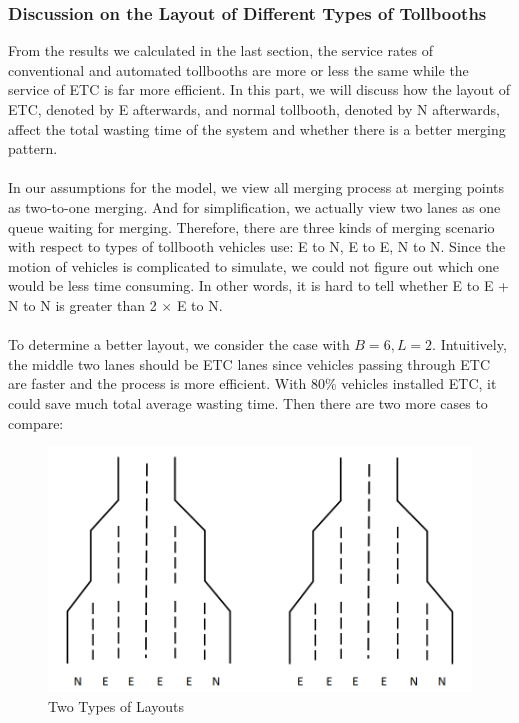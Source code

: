 \subsubsection{Discussion on the Layout of Different Types of Tollbooths}
From the results we calculated in the last section, the service rates of conventional and automated tollbooths are more or less the same while the service of ETC is far more efficient. In this part, we will discuss how the layout of ETC, denoted by E afterwards, and normal tollbooth, denoted by N afterwards, affect the total wasting time of the system and whether there is a better merging pattern.\\  
\\
In our assumptions for the model, we view all merging process at merging points as two-to-one merging. And for simplification, we actually view two lanes as one queue waiting for merging. Therefore, there are three kinds of merging scenario with respect to types of tollbooth vehicles use: E to N, E to E, N to N. Since the motion of vehicles is complicated to simulate, we could not figure out which one would be less time consuming. In other words, it is hard to tell whether E to E + N to N is greater than 2 $\times$ E to N.\\
\\
To determine a better layout, we consider the case with $B = 6, L = 2$. Intuitively, the middle two lanes should be ETC lanes since vehicles passing through ETC are faster and the process is more efficient. With 80\% vehicles installed ETC, it could save much total average wasting time. Then there are two more cases to compare:\\
\begin{figure}[h]
\small
\centering
\includegraphics[width=12cm]{Layout.png}
\caption{Two Types of Layouts} \label{fig: Two Types of Layouts}
\end{figure}

